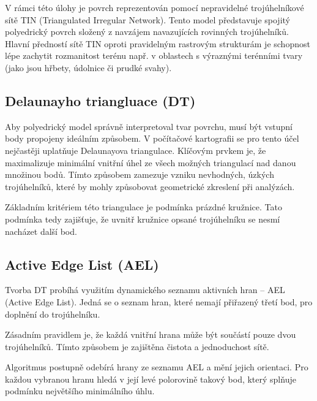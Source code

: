 \documentclass[9pt, a4paper]{article}
\begin{document}
\vspace{0.3 cm}

\noindent V rámci této úlohy je povrch reprezentován pomocí nepravidelné trojúhelníkové sítě TIN (Triangulated Irregular Network). Tento model představuje spojitý polyedrický povrch složený z navzájem navazujících rovinných trojúhelníků. Hlavní předností sítě TIN oproti pravidelným rastrovým strukturám je schopnost lépe zachytit rozmanitost terénu např. v oblastech s výraznými terénními tvary (jako jsou hřbety, údolnice či prudké svahy).

\subsection*{Delaunayho triangluace (DT)}
\vspace{0.3 cm}
\noindent Aby polyedrický model správně interpretoval tvar povrchu, musí být vstupní body propojeny ideálním způsobem. V počítačové kartografii se pro tento účel nejčastěji uplatňuje Delaunayova triangulace. Klíčovým prvkem je, že maximalizuje minimální vnitřní úhel ze všech možných triangulací nad danou množinou bodů. Tímto způsobem zamezuje vzniku nevhodných, úzkých trojúhelníků, které by mohly způsobovat geometrické zkreslení při analýzách.

\vspace{0.3 cm}
\noindent Základním kritériem této triangulace je podmínka prázdné kružnice. Tato podmínka tedy zajišťuje, že uvnitř kružnice opsané trojúhelníku se nesmí nacházet další bod.

\subsection*{Active Edge List (AEL)}
\vspace{0.3 cm}
\noindent Tvorba DT probíhá využitím dynamického seznamu aktivních hran – AEL (Active Edge List). Jedná se o seznam hran, které nemají přiřazený třetí bod, pro doplnění do trojúhelníku.

\vspace{0.3 cm}
\noindent Zásadním pravidlem je, že každá vnitřní hrana může být součástí pouze dvou trojúhelníků. Tímto způsobem je zajištěna čistota a jednoduchost sítě.

\vspace{0.3 cm}
\noindent Algoritmus postupně odebírá hrany ze seznamu AEL a mění jejich orientaci. Pro každou vybranou hranu hledá v její levé polorovině takový bod, který splňuje podmínku největšího minimálního úhlu. 
\end{document}
